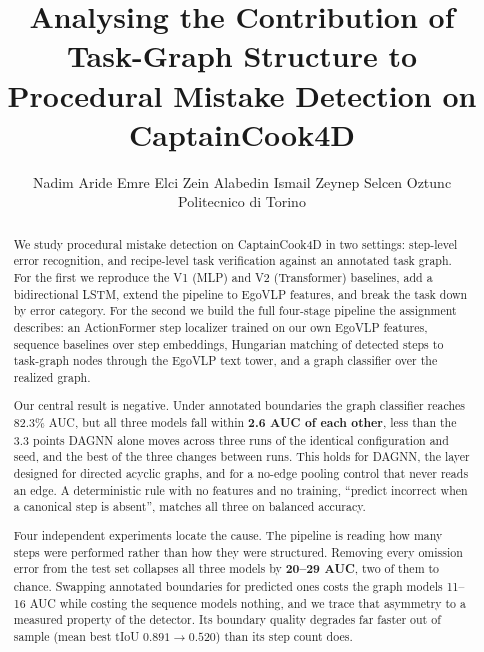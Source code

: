\documentclass[10pt,twocolumn,letterpaper]{article}
\begin{document}
\title{Analysing the Contribution of Task-Graph Structure to\\
Procedural Mistake Detection on CaptainCook4D}

\author{%
  Nadim Aride \quad Emre Elci \quad Zein Alabedin Ismail \quad Zeynep Selcen Oztunc\\
  Politecnico di Torino
}

\maketitle

\begin{abstract}
We study procedural mistake detection on CaptainCook4D in two settings: step-level
error recognition, and recipe-level task verification against an annotated task
graph. For the first we reproduce the V1 (MLP) and V2 (Transformer) baselines,
add a bidirectional LSTM, extend the pipeline to EgoVLP features, and break the
task down by error category. For the second we build the full four-stage pipeline
the assignment describes: an ActionFormer step localizer trained on our own EgoVLP
features, sequence baselines over step embeddings, Hungarian matching of detected
steps to task-graph nodes through the EgoVLP text tower, and a graph classifier
over the realized graph.

Our central result is negative. Under annotated boundaries the graph classifier
reaches 82.3\% AUC, but all three models fall within \textbf{2.6 AUC of each
other}, less than the 3.3 points DAGNN alone moves across three runs of the
identical configuration and seed, and the best of the three changes between runs.
This holds for DAGNN, the layer designed for directed acyclic graphs, and for a
no-edge pooling control that never reads an edge. A
deterministic rule with no features and no training, ``predict incorrect when a
canonical step is absent'', matches all three on balanced accuracy.

Four independent experiments locate the cause. The pipeline is reading how many
steps were performed rather than how they were structured. Removing every omission
error from the test set collapses all three models by \textbf{20--29 AUC}, two of
them to chance. Swapping annotated boundaries for predicted ones costs the graph
models 11--16 AUC while costing the sequence models nothing, and we trace that asymmetry
to a measured property of the detector. Its boundary quality degrades far faster
out of sample (mean best tIoU $0.891 \rightarrow 0.520$) than its step count
does.
\end{abstract}
\end{document}

